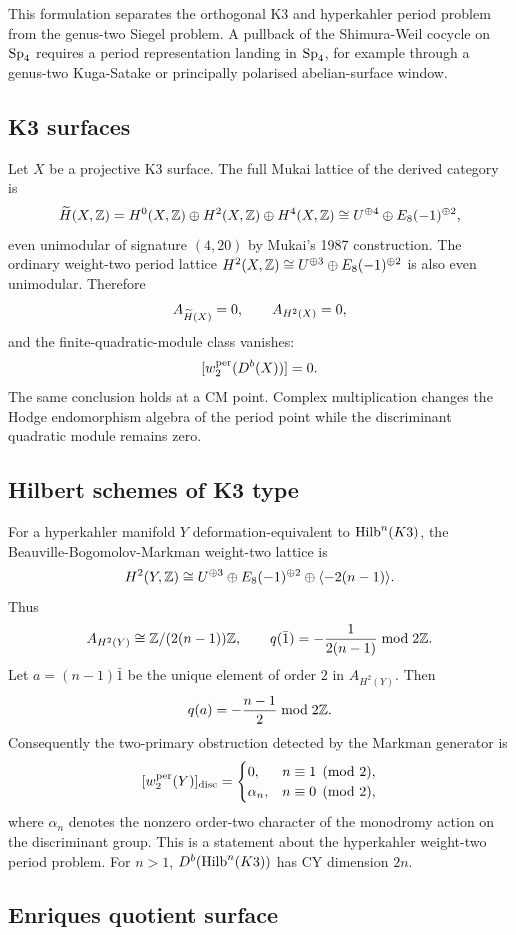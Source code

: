 This formulation separates the orthogonal K3 and hyperkahler period
problem from the genus-two Siegel problem.  A pullback of the
Shimura-Weil cocycle on $\mathrm{Sp}_4$ requires a period
representation landing in $\mathrm{Sp}_4$, for example through a genus-two
Kuga-Satake or principally polarised abelian-surface window.

\subsection*{K3 surfaces}

Let $X$ be a projective K3 surface.  The full Mukai lattice of the
derived category is
\[
  \widetilde{H}(X,\mathbb{Z})=H^0(X,\mathbb{Z})\oplus H^2(X,\mathbb{Z})\oplus H^4(X,\mathbb{Z})
  \cong U^{\oplus4}\oplus E_8(-1)^{\oplus2},
\]
even unimodular of signature $(4,20)$ by Mukai's 1987 construction.
The ordinary weight-two period lattice
$H^2(X,\mathbb{Z})\cong U^{\oplus3}\oplus E_8(-1)^{\oplus2}$ is also even
unimodular.  Therefore
\[
  A_{\widetilde{H}(X)}=0,\qquad A_{H^2(X)}=0,
\]
and the finite-quadratic-module class vanishes:
\[
  [w_2^{\mathrm{per}}(D^b(X))]=0.
\]
The same conclusion holds at a CM point.  Complex multiplication
changes the Hodge endomorphism algebra of the period point while the
discriminant quadratic module remains zero.

\subsection*{Hilbert schemes of K3 type}

For a hyperkahler manifold $Y$ deformation-equivalent to
$\mathrm{Hilb}^n(K3)$, the Beauville-Bogomolov-Markman weight-two lattice is
\[
  H^2(Y,\mathbb{Z})
  \cong U^{\oplus3}\oplus E_8(-1)^{\oplus2}
     \oplus \langle -2(n-1)\rangle .
\]
Thus
\[
  A_{H^2(Y)}\cong \mathbb{Z}/(2(n-1))\mathbb{Z},\qquad
  q(\bar{1})=-\frac{1}{2(n-1)}\bmod 2\mathbb{Z} .
\]
Let $a=(n-1)\bar{1}$ be the unique element of order $2$ in
$A_{H^2(Y)}$.  Then
\[
  q(a)=-\frac{n-1}{2}\bmod 2\mathbb{Z} .
\]
Consequently the two-primary obstruction detected by the Markman
generator is
\[
  [w_2^{\mathrm{per}}(Y)]_{\mathrm{disc}}=
  \begin{cases}
    0, & n\equiv 1 \pmod 2,\\
    \alpha_n, & n\equiv 0 \pmod 2,
  \end{cases}
\]
where $\alpha_n$ denotes the nonzero order-two character of the
monodromy action on the discriminant group.  This is a statement about
the hyperkahler weight-two period problem.  For $n>1$,
$D^b(\mathrm{Hilb}^n(K3))$ has CY dimension $2n$.

\subsection*{Enriques quotient surface}

